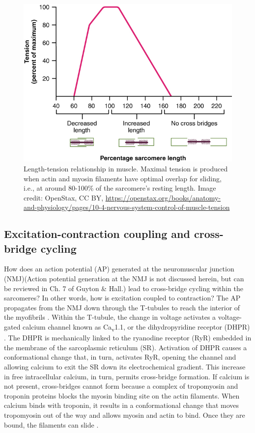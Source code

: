 \documentclass{article}
\begin{document}
\begin{figure}[!htbp]
\centering
\includegraphics[width=0.8\linewidth]{files/EPpXta8zJdzN048lz8AR-226305a3ed3f7dfdf40942f0a3885fd5.jpeg}
\caption[]{Length-tension relationship in muscle. Maximal tension is produced when actin and myosin filaments have optimal overlap for sliding, i.e., at around 80-100\% of the sarcomere's resting length. Image credit: OpenStax, CC BY, \href{https://openstax.org/books/anatomy-and-physiology/pages/10-4-nervous-system-control-of-muscle-tension?query=length-tension\&target=\%7B\%22index\%22\%3A0\%2C\%22type\%22\%3A\%22search\%22\%7D\#fs-id2329081}{https://openstax.org/books/anatomy-and-physiology/pages/10-4-nervous-system-control-of-muscle-tension}}
\label{oRIYhtirNz}
\end{figure}

\subsection{Excitation-contraction coupling and cross-bridge cycling}

How does an action potential (AP) generated at the neuromuscular junction (NMJ)(Action potential generation at the NMJ is not discussed herein, but can be reviewed in Ch. 7 of Guyton \& Hall.) lead to cross-bridge cycling within the sarcomeres? In other words, how is excitation coupled to contraction? The AP propagates from the NMJ down through the T-tubules to reach the interior of the myofibrils \citep{openStax_contraction, guyton2016book}. Within the T-tubule, the change in voltage activates a voltage-gated calcium channel known as Ca\textsubscript{v}1.1, or the dihydropyridine receptor (DHPR) \citep{schneider2012skeletal}. The DHPR is mechanically linked to the ryanodine receptor (RyR) embedded in the membrane of the sarcoplasmic reticulum (SR). Activation of DHPR causes a conformational change that, in turn, activates RyR, opening the channel and allowing calcium to exit the SR down its electrochemical gradient. This increase in free intracellular calcium, in turn, permits cross-bridge formation. If calcium is not present, cross-bridges cannot form because a complex of tropomyosin and troponin proteins blocks the myosin binding site on the actin filaments. When calcium binds with troponin, it results in a conformational change that moves tropomyosin out of the way and allows myosin and actin to bind. Once they are bound, the filaments can slide \citep{schneider2012skeletal, openStax_contraction}.
\end{document}
